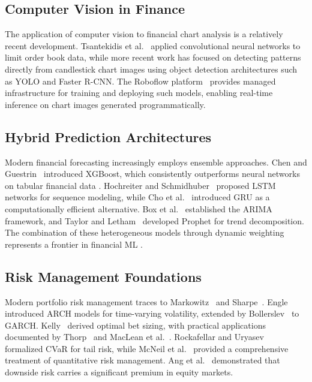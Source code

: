 \documentclass[12pt,a4paper]{article}
\begin{document}
\subsection{Computer Vision in Finance}

The application of computer vision to financial chart analysis is a relatively recent development. Tsantekidis et al.~\cite{tsantekidis2017forecasting} applied convolutional neural networks to limit order book data, while more recent work has focused on detecting patterns directly from candlestick chart images using object detection architectures such as YOLO and Faster R-CNN. The Roboflow platform~\cite{roboflow2023platform} provides managed infrastructure for training and deploying such models, enabling real-time inference on chart images generated programmatically.

\subsection{Hybrid Prediction Architectures}

Modern financial forecasting increasingly employs ensemble approaches. Chen and Guestrin~\cite{chen2016xgboost} introduced XGBoost, which consistently outperforms neural networks on tabular financial data \cite{grinsztajn2022tree}. Hochreiter and Schmidhuber~\cite{hochreiter1997long} proposed LSTM networks for sequence modeling, while Cho et al.~\cite{cho2014learning} introduced GRU as a computationally efficient alternative. Box et al.~\cite{box2015time} established the ARIMA framework, and Taylor and Letham~\cite{taylor2018forecasting} developed Prophet for trend decomposition. The combination of these heterogeneous models through dynamic weighting represents a frontier in financial ML \cite{dietterich2000ensemble}.

\subsection{Risk Management Foundations}

Modern portfolio risk management traces to Markowitz~\cite{markowitz1952portfolio} and Sharpe~\cite{sharpe1964capital}. Engle~\cite{engle1982autoregressive} introduced ARCH models for time-varying volatility, extended by Bollerslev~\cite{bollerslev1986generalized} to GARCH. Kelly~\cite{kelly1956new} derived optimal bet sizing, with practical applications documented by Thorp~\cite{thorp2017man} and MacLean et al.~\cite{maclean2011kelly}. Rockafellar and Uryasev~\cite{rockafellar2000optimization} formalized CVaR for tail risk, while McNeil et al.~\cite{mcneil2005quantitative} provided a comprehensive treatment of quantitative risk management. Ang et al.~\cite{ang2006downside} demonstrated that downside risk carries a significant premium in equity markets.
\end{document}
